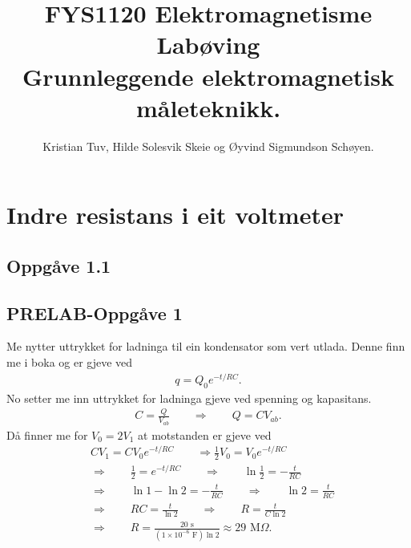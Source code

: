 \documentclass[11pt, a4paper]{article}
\begin{document}
\begin{titlepage}

  \title{\normalsize FYS1120 Elektromagnetisme\\
    \vspace{10mm}
    \huge Labøving\\
    \vspace{10mm}
    \normalsize{\bf Grunnleggende elektromagnetisk måleteknikk.}}

  \author{Kristian Tuv, Hilde Solesvik Skeie og Øyvind Sigmundson Schøyen.}

\end{titlepage}

\maketitle

\newpage
  \tableofcontents
\newpage

\section*{Indre resistans i eit voltmeter}

  \subsection*{Oppgåve 1.1}

  \subsection*{PRELAB-Oppgåve 1}
    Me nytter uttrykket for ladninga til ein kondensator som vert utlada. Denne finn me i boka og er gjeve ved
    \begin{align*}
      q = Q_0e^{-t/RC}.
    \end{align*}
    No setter me inn uttrykket for ladninga gjeve ved spenning og kapasitans.
    \begin{align*}
      C = \frac{Q}{V_{ab}} \qquad \Rightarrow \qquad Q = CV_{ab}.
    \end{align*}
    Då finner me for $V_0 = 2V_1$ at motstanden er gjeve ved
    \begin{align*}
      &CV_1 = CV_0e^{-t/RC} \qquad \Rightarrow \frac{1}{2}V_0 = V_0e^{-t/RC} \\
      &\Rightarrow \qquad \frac{1}{2} = e^{-t/RC} \qquad \Rightarrow \qquad \ln{\frac{1}{2}} = -\frac{t}{RC} \\
      &\Rightarrow \qquad \ln{1} - \ln{2} = -\frac{t}{RC} \qquad \Rightarrow \qquad \ln{2} = \frac{t}{RC} \\
      &\Rightarrow \qquad RC = \frac{t}{\ln{2}} \qquad \Rightarrow \qquad R = \frac{t}{C\ln{2}} \\
      &\Rightarrow \qquad R = \frac{20\text{ s}}{(1\times10^{-6}\text{ F})\ln{2}} \approx 29\text{ M}\Omega.
    \end{align*}
\end{document}
